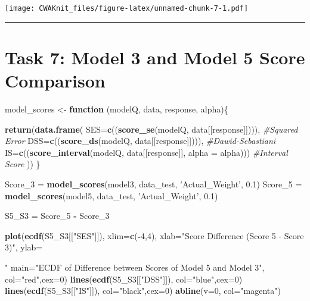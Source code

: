 \documentclass[]{article}
\newenvironment{Shaded}{\begin{snugshade}}{\end{snugshade}}
\newcommand{\KeywordTok}[1]{\textcolor[rgb]{0.13,0.29,0.53}{\textbf{#1}}}
\newcommand{\DataTypeTok}[1]{\textcolor[rgb]{0.13,0.29,0.53}{#1}}
\newcommand{\DecValTok}[1]{\textcolor[rgb]{0.00,0.00,0.81}{#1}}
\newcommand{\FloatTok}[1]{\textcolor[rgb]{0.00,0.00,0.81}{#1}}
\newcommand{\StringTok}[1]{\textcolor[rgb]{0.31,0.60,0.02}{#1}}
\newcommand{\CommentTok}[1]{\textcolor[rgb]{0.56,0.35,0.01}{\textit{#1}}}
\newcommand{\ControlFlowTok}[1]{\textcolor[rgb]{0.13,0.29,0.53}{\textbf{#1}}}
\newcommand{\OperatorTok}[1]{\textcolor[rgb]{0.81,0.36,0.00}{\textbf{#1}}}
\newcommand{\NormalTok}[1]{#1}
\begin{document}
\texttt{[image: CWAKnit\_files/figure-latex/unnamed-chunk-7-1.pdf]}

\begin{center}\rule{0.5\linewidth}{\linethickness}\end{center}

\section{Task 7: Model 3 and Model 5 Score
Comparison}\label{task-7-model-3-and-model-5-score-comparison}

\begin{Shaded}
\begin{Highlighting}[]
\NormalTok{model_scores <-}\StringTok{ }\ControlFlowTok{function}\NormalTok{ (modelQ, data, response, alpha)\{}
  
\KeywordTok{return}\NormalTok{(}\KeywordTok{data.frame}\NormalTok{(}
  \DataTypeTok{SES=}\KeywordTok{c}\NormalTok{((}\KeywordTok{score_se}\NormalTok{(modelQ, data[[response]]))),  }\CommentTok{#Squared Error}
  \DataTypeTok{DSS=}\KeywordTok{c}\NormalTok{((}\KeywordTok{score_ds}\NormalTok{(modelQ, data[[response]]))),  }\CommentTok{#Dawid-Sebastiani}
  \DataTypeTok{IS=}\KeywordTok{c}\NormalTok{((}\KeywordTok{score_interval}\NormalTok{(modelQ, data[[response]], }\DataTypeTok{alpha =}\NormalTok{ alpha))) }\CommentTok{#Interval Score}
\NormalTok{))  }
\NormalTok{\}}

\NormalTok{Score_}\DecValTok{3}\NormalTok{ =}\StringTok{ }\KeywordTok{model_scores}\NormalTok{(model3, data_test, }\StringTok{'Actual_Weight'}\NormalTok{, }\FloatTok{0.1}\NormalTok{)}
\NormalTok{Score_}\DecValTok{5}\NormalTok{ =}\StringTok{ }\KeywordTok{model_scores}\NormalTok{(model5, data_test, }\StringTok{'Actual_Weight'}\NormalTok{, }\FloatTok{0.1}\NormalTok{)}

\NormalTok{S5_S3 =}\StringTok{ }\NormalTok{Score_}\DecValTok{5} \OperatorTok{-}\StringTok{ }\NormalTok{Score_}\DecValTok{3}

\KeywordTok{plot}\NormalTok{(}\KeywordTok{ecdf}\NormalTok{(S5_S3[[}\StringTok{"SES"}\NormalTok{]]),}
      \DataTypeTok{xlim=}\KeywordTok{c}\NormalTok{(}\OperatorTok{-}\DecValTok{4}\NormalTok{,}\DecValTok{4}\NormalTok{),}
      \DataTypeTok{xlab=}\StringTok{"Score Difference (Score 5 - Score 3)"}\NormalTok{,}
      \DataTypeTok{ylab=}\StringTok{"% Test Data Set"}\NormalTok{,}
      \DataTypeTok{main=}\StringTok{"ECDF of Difference between Scores of Model 5 and Model 3"}\NormalTok{,}
      \DataTypeTok{col=}\StringTok{"red"}\NormalTok{,}\DataTypeTok{cex=}\DecValTok{0}\NormalTok{)}
\KeywordTok{lines}\NormalTok{(}\KeywordTok{ecdf}\NormalTok{(S5_S3[[}\StringTok{"DSS"}\NormalTok{]]),}
     \DataTypeTok{col=}\StringTok{"blue"}\NormalTok{,}\DataTypeTok{cex=}\DecValTok{0}\NormalTok{)}
\KeywordTok{lines}\NormalTok{(}\KeywordTok{ecdf}\NormalTok{(S5_S3[[}\StringTok{"IS"}\NormalTok{]]),}
     \DataTypeTok{col=}\StringTok{"black"}\NormalTok{,}\DataTypeTok{cex=}\DecValTok{0}\NormalTok{)}
\KeywordTok{abline}\NormalTok{(}\DataTypeTok{v=}\DecValTok{0}\NormalTok{, }\DataTypeTok{col=}\StringTok{"magenta"}\NormalTok{)}

}
\end{Highlighting}
\end{Shaded}
\end{document}
